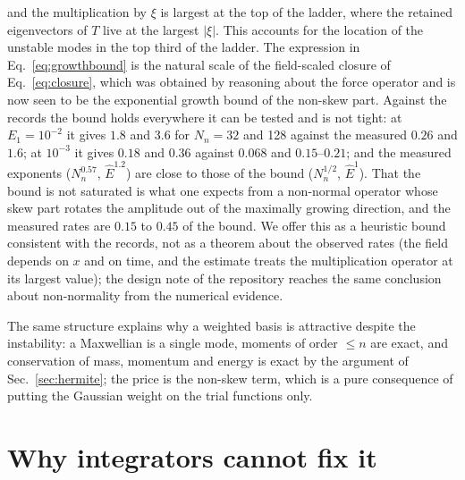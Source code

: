 and the multiplication by $\xi$ is largest at the top of the ladder, where the retained eigenvectors of $T$ live at the largest $|\xi|$. This accounts for the location of the unstable modes in the top third of the ladder. The expression in Eq.~\eqref{eq:growthbound} is the natural scale of the field-scaled closure of Eq.~\eqref{eq:closure}, which was obtained by reasoning about the force operator and is now seen to be the exponential growth bound of the non-skew part. Against the records the bound holds everywhere it can be tested and is not tight: at $E_1=10^{-2}$ it gives $1.8$ and $3.6$ for $N_n=32$ and 128 against the measured $0.26$ and $1.6$; at $10^{-3}$ it gives $0.18$ and $0.36$ against $0.068$ and $0.15$--$0.21$; and the measured exponents ($N_n^{0.57}$, $\hat E^{1.2}$) are close to those of the bound ($N_n^{1/2}$, $\hat E^1$). That the bound is not saturated is what one expects from a non-normal operator whose skew part rotates the amplitude out of the maximally growing direction, and the measured rates are $0.15$ to $0.45$ of the bound. We offer this as a heuristic bound consistent with the records, not as a theorem about the observed rates (the field depends on $x$ and on time, and the estimate treats the multiplication operator at its largest value); the design note of the repository reaches the same conclusion about non-normality from the numerical evidence.

The same structure explains why a weighted basis is attractive despite the instability: a Maxwellian is a single mode, moments of order $\le n$ are exact, and conservation of mass, momentum and energy is exact by the argument of Sec.~\ref{sec:hermite}; the price is the non-skew term, which is a pure consequence of putting the Gaussian weight on the trial functions only.

\section{Why integrators cannot fix it}\label{sec:integrators}

